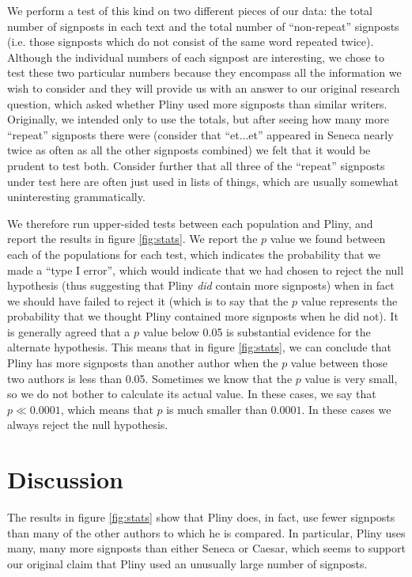 We perform a test of this kind on two different pieces of our data: the total number of signposts in each text and the total number of ``non-repeat'' signposts (i.e. those signposts which do not consist of the same word repeated twice). Although the individual numbers of each signpost are interesting, we chose to test these two particular numbers because they encompass all the information we wish to consider and they will provide us with an answer to our original research question, which asked whether Pliny used more signposts than similar writers. Originally, we intended only to use the totals, but after seeing how many more ``repeat'' signposts there were (consider that ``et...et'' appeared in Seneca nearly twice as often as all the other signposts combined) we felt that it would be prudent to test both. Consider further that all three of the ``repeat'' signposts under test here are often just used in lists of things, which are usually somewhat uninteresting grammatically.

We therefore run upper-sided tests between each population and Pliny, and report the results in figure \ref{fig:stats}. We report the $p$ value we found between each of the populations for each test, which indicates the probability that we made a ``type I error'', which would indicate that we had chosen to reject the null hypothesis (thus suggesting that Pliny \textit{did} contain more signposts) when in fact we should have failed to reject it (which is to say that the $p$ value represents the probability that we thought Pliny contained more signposts when he did not). It is generally agreed that a $p$ value below 0.05 is substantial evidence for the alternate hypothesis. This means that in figure \ref{fig:stats}, we can conclude that Pliny has more signposts than another author when the $p$ value between those two authors is less than 0.05. Sometimes we know that the $p$ value is very small, so we do not bother to calculate its actual value. In these cases, we say that $p \ll 0.0001$, which means that $p$ is much smaller than $0.0001$. In these cases we always reject the null hypothesis.

\section{Discussion}
\label{sec:discuss}

The results in figure \ref{fig:stats} show that Pliny does, in fact, use fewer signposts than many of the other authors to which he is compared. In particular, Pliny uses many, many more signposts than either Seneca or Caesar, which seems to support our original claim that Pliny used an unusually large number of signposts.

